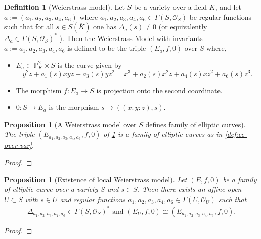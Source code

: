 \documentclass[a4paper,12pt,reqno]{amsart}
\newcommand{\field}[1]{\mathbb{#1}}  %
\renewcommand{\P}{\field{P}}
\newtheorem{proposition}[lemma]{Proposition}
\theoremstyle{definition}
\newtheorem{definition}[lemma]{Definition}
\numberwithin{lemma}{section}
\numberwithin{equation}{section}
\numberwithin{figure}{section}
\begin{document}
\begin{definition}[Weierstrass model]\label{def:weierstrass-model-over-var}
Let $S$ be a variety over a field $K$, and let $a := (a_1,a_2,a_3,a_4,a_6 )$ where $a_1,a_2,a_3,a_4,a_6 \in \Gamma(S,\mathcal O_S)$ be regular functions such that for all $s \in S(\overline K)$ one has $\Delta_{a}(s) \neq 0$ (or equivalently $\Delta_{a} \in \Gamma(S,\mathcal O_S)^*$ ). Then the Weierstrass-Model with invariants $a:={a_1,a_2,a_3,a_4,a_6}$ is defined to be the triple $(E_{a},f,0)$ over $S$ where, \begin{itemize}[label=-]
	\item $E_{a} \subset \P^2_K \times S$ is the curve given by
	$$y^2z+ a_1(s)xyz+a_3(s)yz^2=x^3+a_2(s)x^2z+a_4(s)xz^2+a_6(s)z^3.$$
	\item The morphism $f:  E_{a} \to S$ is projection onto the second coordinate.
	\item  $0 : S \to E_{a} $  is the morphism $s \mapsto ((x:y:z),s)$.
\end{itemize}
\end{definition}

\begin{proposition}[A Weierstrass model over $S$ defines family of elliptic curves]\label{stmt:smooth-weierstrass-over-var-is-ec}
The triple $(E_{a_1,a_2,a_3,a_4,a_6},f,0)$ of \cref{def:weierstrass-model-over-var} is a family of elliptic curves as in \cref{def:ec-over-var}.
\end{proposition}
\begin{proof}
\end{proof}

\begin{proposition}[Existence of local Weierstrass model]\label{stmt:ec-over-var-has-local-weierstrass-model}
	Let $(E,f,0)$ be a family of elliptic curve over a variety $S$ and $s\in S$. Then there exists an affine open $U \subset S$ with $s \in U$ and regular functions $a_1,a_2,a_3,a_4,a_6 \in \Gamma(U,\mathcal O_U)$ such that 
	\begin{align*}
	 \Delta_{a_1,a_2,a_3,a_4,a_6} \in \Gamma(S,\mathcal O_S)^* \text{ and }
	 (E_U,f,0) \cong (E_{a_1,a_2,a_3,a_4,a_6},f,0).
	\end{align*}
\end{proposition}
\begin{proof}
\end{proof}

\end{document}
